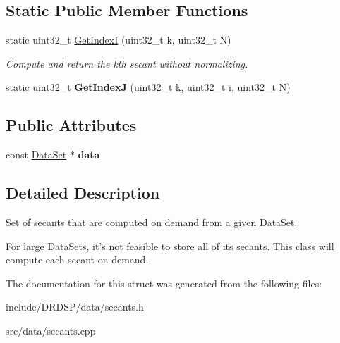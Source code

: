\subsection*{Static Public Member Functions}
\begin{DoxyCompactItemize}
\item 
\hypertarget{struct_d_r_d_s_p_1_1_secants_data_abd9b205c7f0555f87195b241225e988b}{static uint32\-\_\-t \hyperlink{struct_d_r_d_s_p_1_1_secants_data_abd9b205c7f0555f87195b241225e988b}{Get\-Index\-I} (uint32\-\_\-t k, uint32\-\_\-t N)}\label{struct_d_r_d_s_p_1_1_secants_data_abd9b205c7f0555f87195b241225e988b}

\begin{DoxyCompactList}\small\item\em Compute and return the kth secant without normalizing. \end{DoxyCompactList}\item 
\hypertarget{struct_d_r_d_s_p_1_1_secants_data_a7a609eef6b36cdd56d4920e312cc310e}{static uint32\-\_\-t {\bfseries Get\-Index\-J} (uint32\-\_\-t k, uint32\-\_\-t i, uint32\-\_\-t N)}\label{struct_d_r_d_s_p_1_1_secants_data_a7a609eef6b36cdd56d4920e312cc310e}

\end{DoxyCompactItemize}
\subsection*{Public Attributes}
\begin{DoxyCompactItemize}
\item 
\hypertarget{struct_d_r_d_s_p_1_1_secants_data_a1f2646fe6bfc11fdcf779344fc8d532c}{const \hyperlink{struct_d_r_d_s_p_1_1_data_set}{Data\-Set} $\ast$ {\bfseries data}}\label{struct_d_r_d_s_p_1_1_secants_data_a1f2646fe6bfc11fdcf779344fc8d532c}

\end{DoxyCompactItemize}


\subsection{Detailed Description}
Set of secants that are computed on demand from a given \hyperlink{struct_d_r_d_s_p_1_1_data_set}{Data\-Set}. 

For large Data\-Sets, it's not feasible to store all of its secants. This class will compute each secant on demand. 

The documentation for this struct was generated from the following files\-:\begin{DoxyCompactItemize}
\item 
include/\-D\-R\-D\-S\-P/data/secants.\-h\item 
src/data/secants.\-cpp\end{DoxyCompactItemize}
